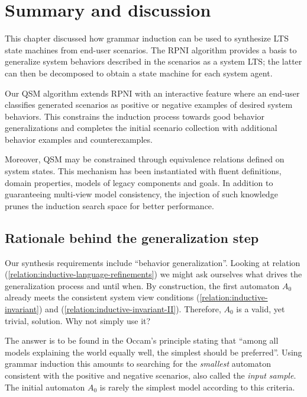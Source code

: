 \section{Summary and discussion\label{section:inductive-discussion}}

This chapter discussed how grammar induction can be used to synthesize LTS state machines from end-user scenarios. The RPNI algorithm provides a basis to generalize system behaviors described in the scenarios as a system LTS; the latter can then be decomposed to obtain a state machine for each system agent. 

Our QSM algorithm extends RPNI with an interactive feature where an end-user classifies generated scenarios as positive or negative examples of desired system behaviors. This constrains the induction process towards good behavior generalizations and completes the initial scenario collection with additional behavior examples and counterexamples.

Moreover, QSM may be constrained through equivalence relations defined on system states. This mechanism has been instantiated with fluent definitions, domain properties, models of legacy components and goals. In addition to guaranteeing multi-view model consistency, the injection of such knowledge prunes the induction search space for better performance.



\subsection{Rationale behind the generalization step}

Our synthesis requirements include ``behavior generalization''. Looking at relation (\ref{relation:inductive-language-refinements}) we might ask ourselves what drives the generalization process and until when. By construction, the first automaton $A_0$ already meets the consistent system view conditions (\ref{relation:inductive-invariant}) and (\ref{relation:inductive-invariant-II}). Therefore, $A_0$ is a valid, yet trivial, solution. Why not simply use it?

The answer is to be found in the Occam's principle stating that ``among all models explaining the world equally well, the simplest should be preferred''. Using grammar induction this amounts to searching for the \emph{smallest} automaton consistent with the positive and negative scenarios, also called the \emph{input sample}. The initial automaton $A_0$ is rarely the simplest model according to this criteria. 

